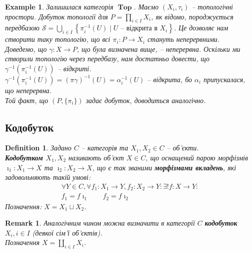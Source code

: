 \documentclass[a4paper, 10pt]{article}
\theoremstyle{theoremdd}
\newtheorem{definition}[theorem]{Definition}
\newtheorem{example}[theorem]{Example}
\newtheorem{remark}[theorem]{Remark}
\DeclareMathOperator{\Top}{\textbf{Top}}
\begin{document}
\begin{example}
Залишилася категорія $\Top$. Маємо $(X_i,\tau_i)$ -- топологічні простори. Добуток топології для $P = \displaystyle\prod_{i \in I} X_i$, як відомо, породжується передбазою $\mathcal{S} = \displaystyle\bigcup_{i \in I}\left\{ \pi_i^{-1}(U) \mid U \text{ -- відкрита в } X_i \right\}$. Це дозволяє нам створити таку топологію, що всі $\pi_i \colon P \to X_i$ стануть неперервними.\\
Доведемо, що $\gamma \colon X \to P$, що була визначена вище, -- неперервна. Оскільки ми створили топологію через передбазу, нам достатньо довести, що $\gamma^{-1}(\pi_i^{-1}(U))$ -- відкриті.\\
$\gamma^{-1}(\pi_i^{-1}(U)) = (\pi \gamma)^{-1}(U) = \alpha_i^{-1}(U)$ -- відкрита, бо $\alpha_i$ припускалася, що неперервна.\\
Той факт, що $(P,\{\pi_i\})$ задає добуток, доводиться аналогічно.
\end{example}

\subsection{Кодобуток}
\begin{definition}
Задано $C$ -- категорія та $X_1,X_2 \in C$ -- об'єкти.\\
\textbf{Кодобутком $X_1,X_2$} називають об'єкт $X \in C$, що оснащений парою морфізмів $\imath_1 \colon X_1 \to X$ та $\imath_2 \colon X_2 \to X$, що є так званими \textbf{морфізмами вкладень}, які задовольняють такій умові:
\begin{align*}
\forall Y \in C, \forall f_1 \colon X_1 \to Y, f_2 \colon X_2 \to Y: \exists ! f \colon X \to Y: \\
f_1 = f \imath_1 \qquad f_2 = f \imath_2
\end{align*}
Позначення: $X = X_1 \sqcup X_2$.
\begin{figure}[H]
\centering
{}
\end{figure}
\end{definition}

\begin{remark}
Аналогічним чином можна визначити в категорії $C$ \textbf{кодобуток $X_i, i \in I$} (деякої сім'ї об'єктів).\\
Позначення $X = \displaystyle\coprod_{i \in I} X_i$.
\end{remark}
\end{document}
